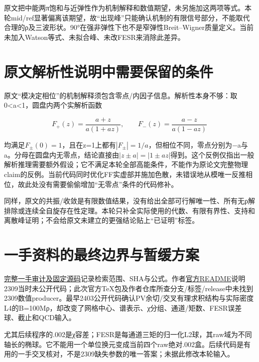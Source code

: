 \documentclass[
  10pt,
  a4paper,
]{article}
\begin{document}
原文把中能两π饱和与近弹性作为机制解释和数值期望，未另施加这两项等式。本轮mid/ref显著偏离该期望，故``出现峰''只能确认机制的有限信号部分，不能取代合理的ρ及三波形状。90°在强非弹性下也不是窄弹性Breit--Wigner质量定义。当前未加入Watson等式、未拟合峰、未改FESR来消除此差异。

\section{原文解析性说明中需要保留的条件}\label{ux539fux6587ux89e3ux6790ux6027ux8bf4ux660eux4e2dux9700ux8981ux4fddux7559ux7684ux6761ux4ef6}

原文``模决定相位''的机制解释须包含零点/内因子信息。解析性本身不够：取0\textless a\textless1，圆盘内两个实解析函数

\[F_+(z)=\frac{a+z}{a(1+az)},\qquad F_-(z)=\frac{a-z}{a(1-az)}\]

均满足\(F_\pm(0)=1\)，且在\textbar z\textbar=1上都有\(|F_\pm|=1/a\)，但相位不同，零点分别为−a与a。分母在圆盘内无零点，结论直接由\(|z\pm a|=|1\pm az|\)得到。这个反例仅指出一般解析推理需要额外假设；它不满足本轮全部高能条件，不能作为原论文完整物理claim的反例。当前代码同时优化FF实虚部并施加色散，未错误地从模唯一反推相位，故此处没有需要偷偷增加``无零点''条件的代码修补。

同样，原文的共振/收敛是有限数值结果，没有给出全部可行解唯一性、所有无ρ解排除或连续全自旋存在性定理。本轮只补全实际使用的代数、有限有界性、支持和离散峰证明；不会给原文未建立的更强结论贴上``已证明''标签。

\section{一手资料的最终边界与暂缓方案}\label{ux4e00ux624bux8d44ux6599ux7684ux6700ux7ec8ux8fb9ux754cux4e0eux6682ux7f13ux65b9ux6848}

\href{../../../evidence/PV_PRIMARY_SOURCE_AUDIT_20260911/AUDIT_ZH.md}{完整一手审计及固定源码}记录检索范围、SHA与公式。作者\href{https://github.com/hyfysics/gauge-theory-bootstrap/blob/801684d9ece3de2918a20145178f569459081098/README.md\#paper-snapshots}{官方README}说明2309当时未公开代码；此次官方TeX包及作者仓库所查分支/标签/release中未找到2309数值producer。最早2403公开代码确认PV余切/交叉有理求积结构与实际密度L4的B=100Mρ，却改变了网格中心、谱表示、χ分组、通道/矩数、FESR误差球、截止和QCD输入。

尤其后续程序的.002是χ容差；FESR是每通道三矩的归一化L2球，其raw域为不同轴长的椭球。它不能用一个单位换元变成当前四个raw绝对.002盒。后续代码是有用的一手交叉核对，不是2309缺失参数的唯一答案；未据此修改本轮输入。
\end{document}

